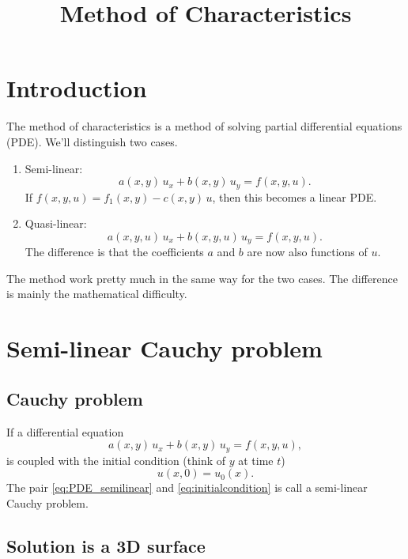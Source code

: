 \documentclass{article}
\begin{document}
\title{Method of Characteristics}
\author{ \vspace{-10ex} }
\date{ \vspace{-10ex} }
\maketitle

\tableofcontents

\section{Introduction}

The method of characteristics
is a method of solving partial differential equations (PDE).
%
We'll distinguish two cases.
\begin{enumerate}
\item Semi-linear:
  $$a(x, y) \, u_x + b(x, y) \, u_y = f(x, y, u).$$
  If $f(x, y, u) = f_1(x, y) - c(x, y) \, u$,
  then this becomes a linear PDE.

\item Quasi-linear:
  $$a(x, y, u) \, u_x + b(x, y, u) \, u_y = f(x, y, u).$$
  The difference is that the coefficients $a$ and $b$
  are now also functions of $u$.
\end{enumerate}
The method work pretty much in the same way
for the two cases.
The difference is mainly the mathematical difficulty.


\section{Semi-linear Cauchy problem}

\subsection{Cauchy problem}

If a differential equation
\begin{equation}
a(x, y) \, u_x  + b(x, y) \, u_y = f(x,y, u),
\label{eq:PDE_semilinear}
\end{equation}
is coupled with the initial condition (think of $y$ at time $t$)
\begin{equation}
u(x, 0) = u_0(x).
\label{eq:initialcondition}
\end{equation}
The pair \eqref{eq:PDE_semilinear} and \eqref{eq:initialcondition}
is call a semi-linear Cauchy problem.


\subsection{Solution is a 3D surface}
\end{document}
